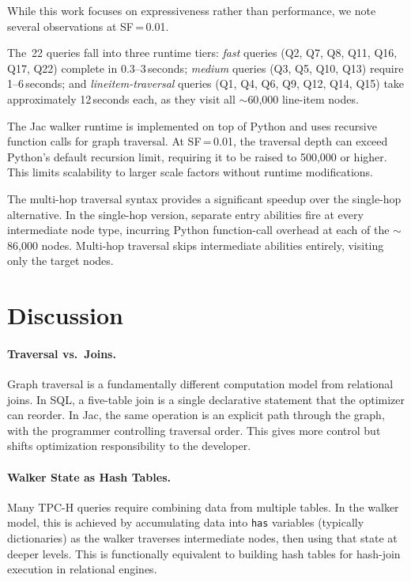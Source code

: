 \documentclass[11pt]{article}
\begin{document}
While this work focuses on expressiveness rather than performance, we
note several observations at SF\,=\,0.01.

The~22 queries fall into three runtime tiers:
\emph{fast} queries (Q2, Q7, Q8, Q11, Q16, Q17, Q22) complete in
0.3--3\,seconds;
\emph{medium} queries (Q3, Q5, Q10, Q13) require 1--6\,seconds;
and \emph{lineitem-traversal} queries (Q1, Q4, Q6, Q9, Q12, Q14, Q15)
take approximately 12\,seconds each, as they visit all $\sim$60{,}000
line-item nodes.

The Jac walker runtime is implemented on top of Python and uses
recursive function calls for graph traversal.
At SF\,=\,0.01, the traversal depth can exceed Python's default recursion
limit, requiring it to be raised to 500{,}000 or higher.
This limits scalability to larger scale factors without runtime
modifications.

The multi-hop traversal syntax provides a significant speedup over the
single-hop alternative.
In the single-hop version, separate entry abilities fire at every
intermediate node type, incurring Python function-call overhead at each
of the $\sim$86{,}000 nodes.
Multi-hop traversal skips intermediate abilities entirely, visiting only
the target nodes.

\section{Discussion}

\paragraph{Traversal vs.\ Joins.}
Graph traversal is a fundamentally different computation model from
relational joins.
In SQL, a five-table join is a single declarative statement that the
optimizer can reorder.
In Jac, the same operation is an explicit path through the graph, with
the programmer controlling traversal order.
This gives more control but shifts optimization responsibility to the
developer.

\paragraph{Walker State as Hash Tables.}
Many TPC-H queries require combining data from multiple tables.
In the walker model, this is achieved by accumulating data into
\lstinline|has| variables (typically dictionaries) as the walker
traverses intermediate nodes, then using that state at deeper levels.
This is functionally equivalent to building hash tables for hash-join
execution in relational engines.
\end{document}
